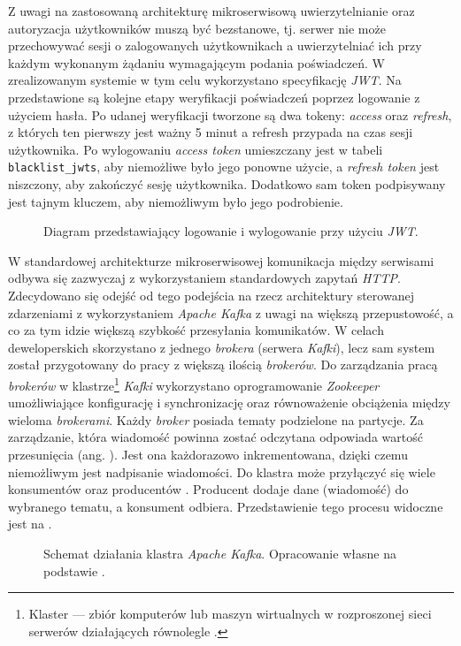 Z uwagi na zastosowaną architekturę mikroserwisową uwierzytelnianie oraz autoryzacja użytkowników muszą być bezstanowe,
tj. serwer nie może przechowywać sesji o zalogowanych użytkownikach a uwierzytelniać ich przy każdym wykonanym żądaniu
wymagającym podania poświadczeń. W zrealizowanym systemie w tym celu wykorzystano specyfikację \textit{JWT}. Na
 przedstawione są kolejne etapy weryfikacji poświadczeń poprzez logowanie z użyciem hasła. Po
udanej weryfikacji tworzone są dwa tokeny: \textit{access} oraz \textit{refresh}, z których ten pierwszy jest ważny 5
minut a refresh przypada na czas sesji użytkownika. Po wylogowaniu \textit{access token} umieszczany jest w tabeli
\verb|blacklist_jwts|, aby niemożliwe było jego ponowne użycie, a \textit{refresh token} jest niszczony, aby zakończyć
sesję użytkownika. Dodatkowo sam token podpisywany jest tajnym kluczem, aby niemożliwym było jego podrobienie.
%
\begin{figure}[H]
  \centering
  \caption{Diagram przedstawiający logowanie i wylogowanie przy użyciu \textit{JWT}.}
  \label{fig:jwt-schema}
\end{figure}


W standardowej architekturze mikroserwisowej komunikacja między serwisami odbywa się zazwyczaj z wykorzystaniem
standardowych zapytań \textit{HTTP}. Zdecydowano się odejść od tego podejścia na rzecz architektury sterowanej
zdarzeniami z wykorzystaniem \textit{Apache Kafka} z uwagi na większą przepustowość, a co za tym idzie większą szybkość
przesyłania komunikatów. W celach deweloperskich skorzystano z jednego \textit{brokera} (serwera \textit{Kafki}), lecz
sam system został przygotowany do pracy z większą ilością \textit{brokerów}. Do zarządzania pracą \textit{brokerów} w
klastrze\footnote{Klaster — zbiór komputerów lub maszyn wirtualnych w rozproszonej sieci serwerów działających
  równolegle \cite{bib:cluster-definition}.} \textit{Kafki} wykorzystano oprogramowanie \textit{Zookeeper} umożliwiające
konfigurację i synchronizację oraz równoważenie obciążenia między wieloma \textit{brokerami}. Każdy \textit{broker}
posiada tematy podzielone na partycje. Za zarządzanie, która wiadomość powinna zostać odczytana odpowiada wartość
przesunięcia (ang. ). Jest ona każdorazowo inkrementowana, dzięki czemu niemożliwym jest nadpisanie
wiadomości. Do klastra może przyłączyć się wiele konsumentów oraz producentów \cite{bib:kafka-overview}. Producent
dodaje dane (wiadomość) do wybranego tematu, a konsument odbiera. Przedstawienie tego procesu widoczne jest na
.
%
\begin{figure}[H]
  \centering
  \caption{
    Schemat działania klastra \textit{Apache Kafka}. Opracowanie własne na podstawie \cite{bib:kafka-cluster-image}.
  }
  \label{fig:kafka-async}
\end{figure}

